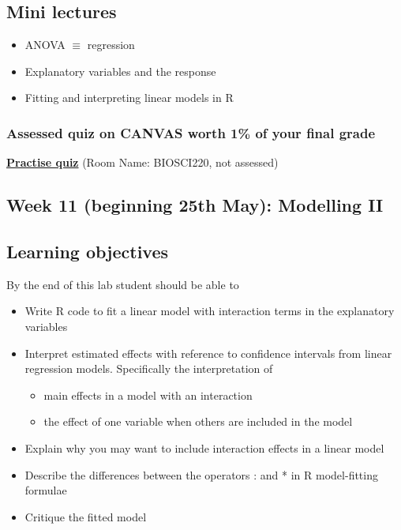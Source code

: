 \documentclass{article}
\begin{document}
\subsection*{Mini lectures}

\begin{itemize}
\item ANOVA $\equiv$ regression
\item Explanatory variables and the response
\item Fitting and interpreting linear models in R
\end{itemize}


\subsubsection*{Assessed quiz on CANVAS worth 1\% of your final grade}

\begin{center}
  \href{https://b.socrative.com/login/student/}{\textbf{\Large Practise quiz}} (Room Name: BIOSCI220, not assessed)
  
\end{center}


\newpage

\subsection*{Week 11 (beginning 25th May): Modelling II}
\subsection*{Learning objectives}
By the end of this lab student should be able to
\begin{itemize}
\item Write R code to fit a linear model with interaction terms in the explanatory variables
\item Interpret estimated effects with reference to confidence intervals from linear regression models. Specifically the interpretation of
  \begin{itemize}
  \item main effects in a model with an interaction
  \item the effect of one variable when others are included in the model
  \end{itemize}
\item Explain why you may want to include interaction effects in a linear model
\item Describe the differences between the operators : and * in R model-fitting formulae
\item Critique the fitted model
\end{itemize}
\end{document}

